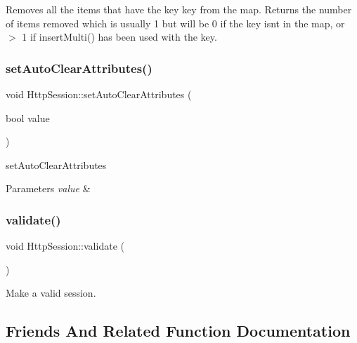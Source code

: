 Removes all the items that have the key key from the map. Returns the number of items removed which is usually 1 but will be 0 if the key isn\textquotesingle{}t in the map, or $>$ 1 if insert\+Multi() has been used with the key. 

\mbox{\label{class_http_session_a6ba761b5e4935168f867b3e4953a4179}} 
\subsubsection{\texorpdfstring{set\+Auto\+Clear\+Attributes()}{setAutoClearAttributes()}}
{\footnotesize\ttfamily void Http\+Session\+::set\+Auto\+Clear\+Attributes (\begin{DoxyParamCaption}\item[{bool}]{value }\end{DoxyParamCaption})}



set\+Auto\+Clear\+Attributes 


\begin{DoxyParams}{Parameters}
{\em value} & \\
\hline
\end{DoxyParams}
\mbox{\label{class_http_session_adc118d02431eec30977bd1cb3429eb79}} 
\subsubsection{\texorpdfstring{validate()}{validate()}}
{\footnotesize\ttfamily void Http\+Session\+::validate (\begin{DoxyParamCaption}{ }\end{DoxyParamCaption})}



Make a valid session. 



\subsection{Friends And Related Function Documentation}
\mbox{\label{class_http_session_a4d54f5003e07e218070a449c22a52c7c}} 
